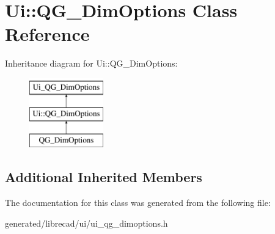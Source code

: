 \hypertarget{classUi_1_1QG__DimOptions}{\section{Ui\-:\-:Q\-G\-\_\-\-Dim\-Options Class Reference}
\label{classUi_1_1QG__DimOptions}
}
Inheritance diagram for Ui\-:\-:Q\-G\-\_\-\-Dim\-Options\-:\begin{figure}[H]
\begin{center}
\leavevmode
\includegraphics[height=3.000000cm]{classUi_1_1QG__DimOptions}
\end{center}
\end{figure}
\subsection*{Additional Inherited Members}


The documentation for this class was generated from the following file\-:\begin{DoxyCompactItemize}
\item 
generated/librecad/ui/ui\-\_\-qg\-\_\-dimoptions.\-h\end{DoxyCompactItemize}
